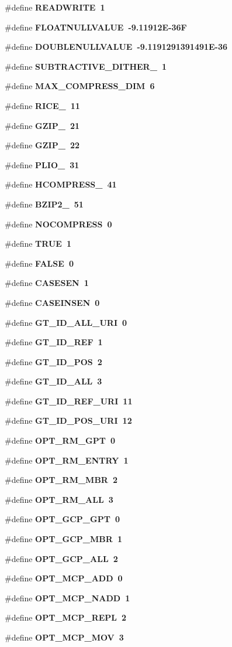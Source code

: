 \begin{CompactItemize}
\item 
\#define \bf{READWRITE}~1
\item 
\#define \bf{FLOATNULLVALUE}~-9.11912E-36F
\item 
\#define \bf{DOUBLENULLVALUE}~-9.1191291391491E-36
\item 
\#define \bf{SUBTRACTIVE\_\-DITHER\_}~1
\item 
\#define \bf{MAX\_\-COMPRESS\_\-DIM}~6
\item 
\#define \bf{RICE\_}~11
\item 
\#define \bf{GZIP\_}~21
\item 
\#define \bf{GZIP\_}~22
\item 
\#define \bf{PLIO\_}~31
\item 
\#define \bf{HCOMPRESS\_}~41
\item 
\#define \bf{BZIP2\_}~51
\item 
\#define \bf{NOCOMPRESS}~0
\item 
\#define \bf{TRUE}~1
\item 
\#define \bf{FALSE}~0
\item 
\#define \bf{CASESEN}~1
\item 
\#define \bf{CASEINSEN}~0
\item 
\#define \bf{GT\_\-ID\_\-ALL\_\-URI}~0
\item 
\#define \bf{GT\_\-ID\_\-REF}~1
\item 
\#define \bf{GT\_\-ID\_\-POS}~2
\item 
\#define \bf{GT\_\-ID\_\-ALL}~3
\item 
\#define \bf{GT\_\-ID\_\-REF\_\-URI}~11
\item 
\#define \bf{GT\_\-ID\_\-POS\_\-URI}~12
\item 
\#define \bf{OPT\_\-RM\_\-GPT}~0
\item 
\#define \bf{OPT\_\-RM\_\-ENTRY}~1
\item 
\#define \bf{OPT\_\-RM\_\-MBR}~2
\item 
\#define \bf{OPT\_\-RM\_\-ALL}~3
\item 
\#define \bf{OPT\_\-GCP\_\-GPT}~0
\item 
\#define \bf{OPT\_\-GCP\_\-MBR}~1
\item 
\#define \bf{OPT\_\-GCP\_\-ALL}~2
\item 
\#define \bf{OPT\_\-MCP\_\-ADD}~0
\item 
\#define \bf{OPT\_\-MCP\_\-NADD}~1
\item 
\#define \bf{OPT\_\-MCP\_\-REPL}~2
\item 
\#define \bf{OPT\_\-MCP\_\-MOV}~3

\end{CompactItemize}
